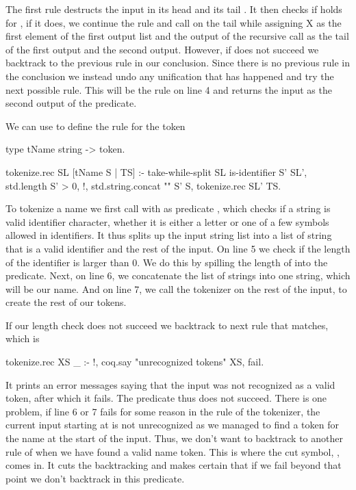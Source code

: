 \documentclass[thesis.tex]{subfiles}
\begin{document}
{The first rule destructs the input in its head  and its tail . It then checks if  holds for , if it does, we continue the rule and call  on the tail while assigning X as the first element of the first output list and the output of the recursive call as the tail of the first output and the second output. However, if  does not succeed we backtrack to the previous rule in our conclusion. Since there is no previous rule in the conclusion we instead undo any unification that has happened and try the next possible rule. This will be the rule on line 4 and returns the input as the second output of the predicate.

We can use  to define the rule for the token 
\begin{elpicode}
  type tName string -> token.

  tokenize.rec SL [tName S | TS] :-
    take-while-split SL is-identifier S' SL',
    { std.length S' } > 0, !,
    std.string.concat "" S' S,
    tokenize.rec SL' TS.
\end{elpicode}
To tokenize a name we first call  with as predicate , which checks if a string is valid identifier character, whether it is either a letter or one of a few symbols allowed in identifiers. It thus splits up the input string list into a list of string that is a valid identifier and the rest of the input.
On line 5 we check if the length of the identifier is larger than 0. We do this by spilling the length of  into the \elpii{>} predicate.
Next, on line 6, we concatenate the list of strings into one string, which will be our name.
And on line 7, we call the tokenizer on the rest of the input, to create the rest of our tokens.

If our length check does not succeed we backtrack to next rule that matches, which is
\begin{elpicode}
  tokenize.rec XS _ :- !, 
    coq.say "unrecognized tokens" XS, fail.  
\end{elpicode}
It prints an error messages saying that the input was not recognized as a valid token, after which it fails. The predicate thus does not succeed. There is one problem, if line 6 or 7 fails for some reason in the  rule of the tokenizer, the current input starting at  is not unrecognized as we managed to find a token for the name at the start of the input. Thus, we don't want to backtrack to another rule of  when we have found a valid name token. This is where the cut symbol, \elpii{!}, comes in. It cuts the backtracking and makes certain that if we fail beyond that point we don't backtrack in this predicate.

}
\end{document}
